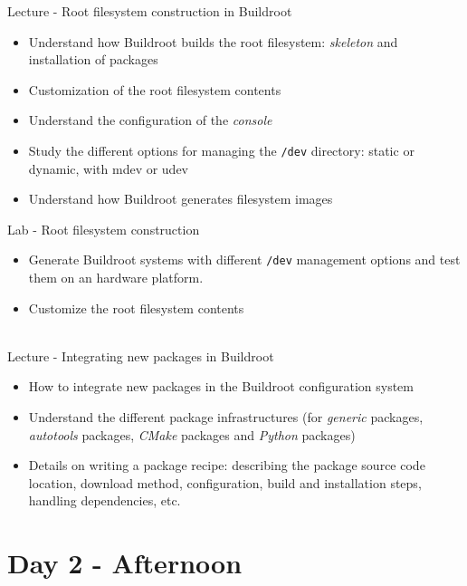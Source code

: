 \documentclass[a4paper,12pt,obeyspaces,spaces,hyphens]{article}
\begin{document}
\feagendatwocolumn
{Lecture - Root filesystem construction in Buildroot}
{
  \begin{itemize}
  \item Understand how Buildroot builds the root filesystem: {\em
      skeleton} and installation of packages
  \item Customization of the root filesystem contents
  \item Understand the configuration of the {\em console}
  \item Study the different options for managing the {\tt /dev}
    directory: static or dynamic, with mdev or udev
  \item Understand how Buildroot generates filesystem images
  \end{itemize}
}
{Lab - Root filesystem construction}
{
  \begin{itemize}
  \item Generate Buildroot systems with different {\tt /dev}
    management options and test them on an hardware platform.
  \item Customize the root filesystem contents
  \end{itemize}
}
\\
\feagendaonecolumn
{Lecture - Integrating new packages in Buildroot}
{
  \begin{itemize}
  \item How to integrate new packages in the Buildroot configuration
    system
  \item Understand the different package infrastructures (for {\em
      generic} packages, {\em autotools} packages, {\em CMake}
    packages and {\em Python} packages)
  \item Details on writing a package recipe: describing the package
    source code location, download method, configuration, build and
    installation steps, handling dependencies, etc.
  \end{itemize}
}

\section{Day 2 - Afternoon}
\end{document}
